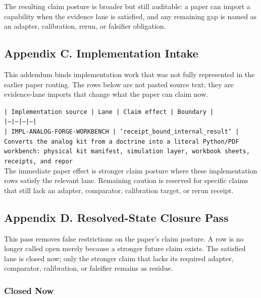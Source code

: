 \documentclass[11pt]{article}
\begin{document}
The resulting claim posture is broader but still auditable: a paper can import a capability when the evidence lane is satisfied, and any remaining gap is named as an adapter, calibration, rerun, or falsifier obligation.

\subsection*{Appendix C. Implementation Intake}

This addendum binds implementation work that was not fully represented in the earlier paper routing. The rows below are not pasted source text; they are evidence-lane imports that change what the paper can claim now.

\noindent\texttt{| Implementation source | Lane | Claim effect | Boundary |}\\
\noindent\texttt{|---|---|---|---|}\\
\noindent\texttt{| IMPL-ANALOG-FORGE-WORKBENCH | `receipt\_bound\_internal\_result` | Converts the analog kit from a doctrine into a literal Python/PDF workbench: physical kit manifest, simulation layer, workbook sheets, receipts, and repor}\\

The immediate paper effect is stronger claim posture where these implementation rows satisfy the relevant lane. Remaining caution is reserved for specific claims that still lack an adapter, comparator, calibration target, or rerun receipt.

\subsection*{Appendix D. Resolved-State Closure Pass}

This pass removes false restrictions on the paper's claim posture. A row is no longer called open merely because a stronger future claim exists. The satisfied lane is closed now; only the stronger claim that lacks its required adapter, comparator, calibration, or falsifier remains as residue.

\subsubsection*{Closed Now}
\end{document}
